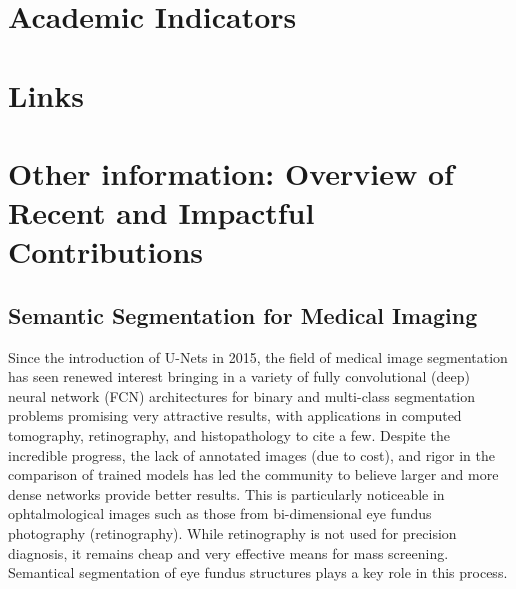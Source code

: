\documentclass[11pt,a4paper,sans]{moderncv}
\begin{document}

\section{Academic Indicators}


\section{Links}


\section{Other information: Overview of Recent and Impactful Contributions}

\subsection{Semantic Segmentation for Medical Imaging}

Since the introduction of U-Nets in 2015, the field of medical image
segmentation has seen renewed interest bringing in a variety of fully
convolutional (deep) neural network (FCN) architectures for binary and
multi-class segmentation problems promising very attractive results, with
applications in computed tomography, retinography, and histopathology to cite a
few.  Despite the incredible progress, the lack of annotated images (due to
cost), and rigor in the comparison of trained models has led the community to
believe larger and more dense networks provide better results.  This is
particularly noticeable in ophtalmological images such as those from
bi-dimensional eye fundus photography (retinography).  While retinography is
not used for precision diagnosis, it remains cheap and very effective means for
mass screening.  Semantical segmentation of eye fundus structures plays a key
role in this process.
\end{document}
